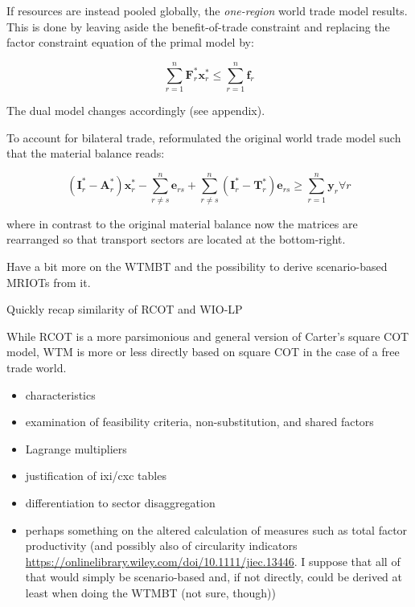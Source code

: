 \documentclass{article}
\begin{document}
\begin{refsection}
If resources are instead pooled globally, the \emph{one-region} world trade model results. This is done by leaving aside the benefit-of-trade constraint and replacing the factor constraint equation of the primal model by:

\begin{equation}
    \sum_{r=1}^{n} \bm{F}^{*}_{r} \bm{x}^{*}_{r} \le \sum_{r=1}^{n} {\bm{f}_{r}}
\end{equation}

The dual model changes accordingly (see appendix).

To account for bilateral trade, \textcite{stromman_2006} reformulated the original world trade model such that the material balance reads:

\begin{equation}
    (\bm{I}^{*}_{r} - \bm{A}^{*}_{r}) \bm{x}^{*}_{r} - \sum_{r \neq s}^{n} \bm{e}_{rs} + \sum_{r \neq s}^{n}  (\bm{I}^{*}_{r} - \bm{T}^{*}_{r}) \bm{e}_{rs} \ge \sum_{r=1}^{n} {\bm{y}_{r}} \forall r
\end{equation}

where in contrast to the original material balance now the matrices are rearranged so that transport sectors are located at the bottom-right.

Have a bit more on the WTMBT and the possibility to derive scenario-based MRIOTs from it.

Quickly recap similarity of RCOT and WIO-LP \parencite{kondo_nakamura_2005}

While RCOT is a more parsimonious and general version of Carter's square COT model, WTM is more or less directly based on square COT in the case of a free trade world.


\begin{itemize}
    \item characteristics
    \item examination of feasibility criteria, non-substitution, and shared factors
    \item Lagrange multipliers
    \item justification of ixi/cxc tables
    \item differentiation to sector disaggregation
    \item perhaps something on the altered calculation of measures such as total factor productivity (and possibly also of circularity indicators \url{https://onlinelibrary.wiley.com/doi/10.1111/jiec.13446}. I suppose that all of that would simply be scenario-based and, if not directly, could be derived at least when doing the WTMBT (not sure, though))
\end{itemize}


\end{refsection}
\end{document}
